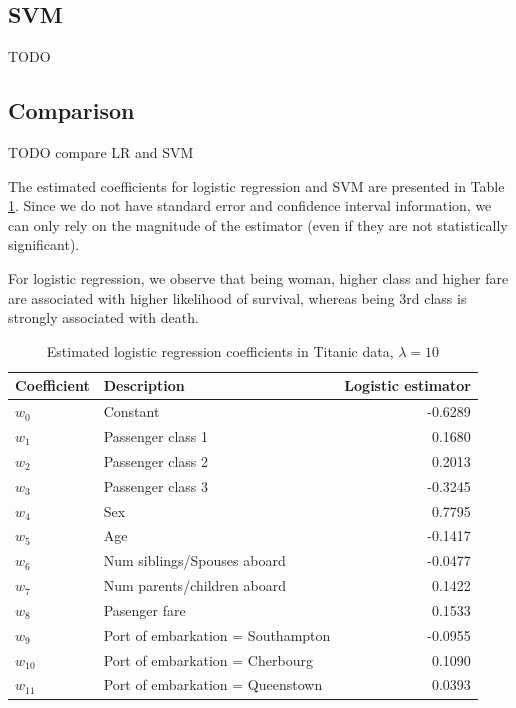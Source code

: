 \subsection{SVM}
TODO

\subsection{Comparison}
TODO compare LR and SVM

The estimated coefficients for logistic regression and SVM are presented in Table \ref{tab:titanic_coeff}. Since we do not have standard error and confidence interval information, we can only rely on the magnitude of the estimator (even if they are not statistically significant). 

For logistic regression, we observe that being woman, higher class and higher fare are associated with higher likelihood of survival, whereas being 3rd class is strongly associated with death. 

\begin{table}[h!]
\centering
\caption{Estimated logistic regression coefficients in Titanic data, $\lambda = 10$}
\begin{tabular}{llr}
	\hline 
	Coefficient & Description & Logistic estimator \\
  \hline
  $w_0$  & Constant &-0.6289 \\
  $w_1$ 	& Passenger class 1 & 0.1680\\
  $w_2$ 	& Passenger class 2	  & 0.2013\\
  $w_3$  & Passenger class 3 & -0.3245\\
  $w_4$ 	 & Sex & 0.7795\\
  $w_5$ 	 & Age & -0.1417\\
  $w_6$ 	 & Num siblings/Spouses aboard & -0.0477 \\
  $w_7$ 	 & Num parents/children aboard & 0.1422\\
  $w_8$ 	 & Pasenger fare & 0.1533\\
  $w_9$ 	 & Port of embarkation = Southampton & -0.0955\\
  $w_{10}$  & Port of embarkation = Cherbourg & 0.1090\\
  $w_{11}$ & Port of embarkation = Queenstown	& 0.0393	\\
  \hline
\end{tabular}\label{tab:titanic_coeff}
\end{table}




